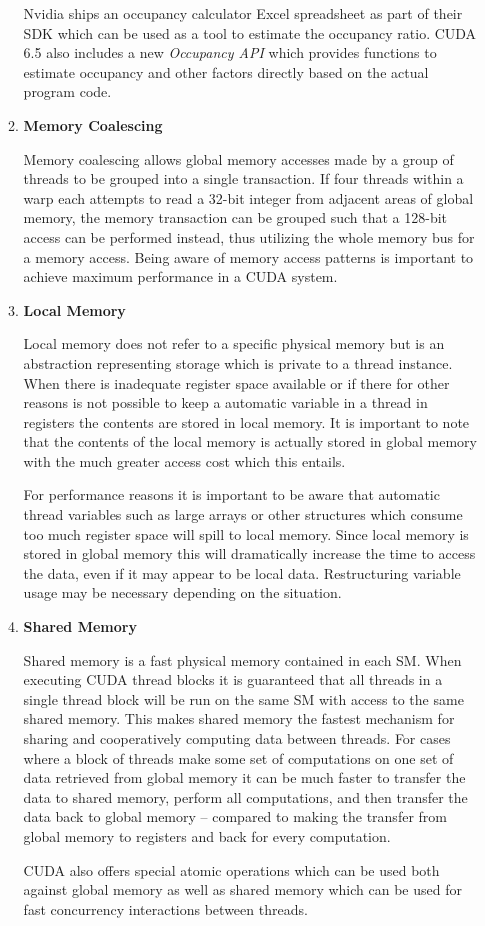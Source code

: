 \begin{enumerate}
\begin{enumerate}
Nvidia ships an occupancy calculator Excel spreadsheet as part of their SDK which can be used as a tool to estimate the occupancy ratio. \ac{CUDA} 6.5 also includes a new \textit{Occupancy API} which provides functions to estimate occupancy and other factors directly based on the actual program code.

\item \textbf{Memory Coalescing}

Memory coalescing allows global memory accesses made by a group of threads to be grouped into a single transaction. If four threads within a warp each attempts to read a 32-bit integer from adjacent areas of global memory, the memory transaction can be grouped such that a 128-bit access can be performed instead, thus utilizing the whole memory bus for a memory access. Being aware of memory access patterns is important to achieve maximum performance in a \ac{CUDA} system.

\item \textbf{Local Memory}

Local memory does not refer to a specific physical memory but is an abstraction representing storage which is private to a thread instance. When there is inadequate register space available or if there for other reasons is not possible to keep a automatic variable in a thread in registers the contents are stored in local memory. It is important to note that the contents of the local memory is actually stored in global memory with the much greater access cost which this entails.

For performance reasons it is important to be aware that automatic thread variables such as large arrays or other structures which consume too much register space will spill to local memory. Since local memory is stored in global memory this will dramatically increase the time to access the data, even if it may appear to be local data. Restructuring variable usage may be necessary depending on the situation.

\item \textbf{Shared Memory}

Shared memory is a fast physical memory contained in each \ac{SM}. When executing \ac{CUDA} thread blocks it is guaranteed that all threads in a single thread block will be run on the same \ac{SM} with access to the same shared memory. This makes shared memory the fastest mechanism for sharing and cooperatively computing data between threads. For cases where a block of threads make some set of computations on one set of data retrieved from global memory it can be much faster to transfer the data to shared memory, perform all computations, and then transfer the data back to global memory -- compared to making the transfer from global memory to registers and back for every computation.

\ac{CUDA} also offers special atomic operations which can be used both against global memory as well as shared memory which can be used for fast concurrency interactions between threads.

\end{enumerate}

\end{enumerate}

